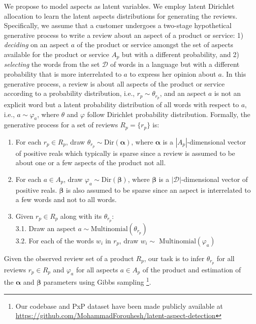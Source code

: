 \documentclass[11pt]{article}
\begin{document}
We propose to model aspects as latent variables. We employ latent Dirichlet allocation to learn the latent aspects distributions for generating the reviews. Specifically, we assume that a customer undergoes a two-stage hypothetical generative process to write a review about an aspect of a product or service: 1) \textit{deciding} on an aspect $a$ of the product or service amongst the set of aspects available for the product or service ${A_p}$ but with a different probability, and 2) \textit{selecting} the words from the set $\mathcal{D}$ of words in a language but with a different probability that is more interrelated to $a$ to express her opinion about $a$. In this generative process, a review is about all aspects of the product or service according to a probability distribution, i.e., $r_p \sim \theta_{r_p}$, and an aspect $a$ is not an explicit word but a latent probability distribution of all words with respect to $a$, i.e., $a \sim \varphi_a$, where ${\theta}$ and ${\varphi}$ follow Dirichlet probability distribution. Formally, the generative process for a set of reviews $R_p = \{r_p\}$ is:
\begin{enumerate}\item For each $r_p \in R_p$, draw $\theta_{r_p} \sim \text{Dir}(\bm{\alpha})$, where $\bm{\alpha}$ is a ${|A_p|}$-dimensional vector of positive reals which typically is sparse since a review is assumed to be about one or a few aspects of the product not all.
    \item For each $a \in A_p$, draw ${\varphi_a \sim  \text{Dir}(\bm{\beta})}$, where ${\bm{\beta}}$ is a ${|\mathcal{D}|}$-dimensional vector of positive reals. ${\bm{\beta}}$ is also assumed to be sparse since an aspect is interrelated to a few words and not to all words. 
    \item Given ${r_p \in R_p}$ along with its $\theta_{r_p}$:\\
 3.1. Draw an aspect ${a \sim \text{Multinomial}(\theta_{r_p})}$ \\
 3.2. For each of the words ${w_i}$ in ${r_p}$, draw  ${w_i \sim }$ $\text{Multinomial}({{\varphi}_a})$ \\ 
\end{enumerate}
Given the observed review set of a product ${R_p}$, our task is to infer $\theta_{r_p}$ for all reviews ${r_p \in R_p}$ and ${\varphi_a}$ for all aspects ${a \in A_p}$ of the product and estimation of the ${\bm{\alpha}}$ and ${\bm{\beta}}$ parameters using Gibbs sampling \cite{XiaoS_2010}\footnote{Our codebase and PxP dataset have been made publicly available at \href{https://github.com/MohammadForouhesh/latent-aspect-detection}{https://github.com/MohammadForouhesh/latent-aspect-detection}}.
\end{document}
